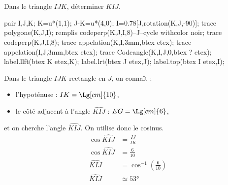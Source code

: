 \begin{methode}
    \exercice    
    Dans le triangle $IJK$, déterminer $\widehat{KIJ}$.\\
    \begin{Geometrie}[CoinHD={(6u,4.5u)}]        
        pair I,J,K;
        K=u*(1,1);
        J-K=u*(4,0);
        I=0.78[J,rotation(K,J,-90)];
        trace polygone(K,J,I);
        remplis codeperp(K,J,I,8)--J--cycle withcolor noir;
        trace codeperp(K,J,I,8);
        trace appelation(K,I,3mm,btex  etex);
        trace appelation(I,J,3mm,btex  etex);                
        trace Codeangle(K,I,J,0,btex ? etex);
        label.llft(btex K etex,K);
        label.lrt(btex J etex,J);
        label.top(btex I etex,I);
    \end{Geometrie}
    \correction
    Dans le triangle $IJK$ rectangle en $J$, on connaît :
    \begin{itemize}        
        \item l'hypoténuse : $IK=\Lg[cm]{10}$,
        \item le côté adjacent à l'angle $\widehat{KIJ}$ : $EG=\Lg[cm]{6}$,
    \end{itemize}
    et on cherche l'angle $\widehat{KIJ}$. On utilise donc le cosinus.
    \begin{align*}
        \cos\widehat{KIJ}&=\frac{IJ}{IK}\\
        \cos\widehat{KIJ}&=\frac{6}{10}\\
        \widehat{KIJ}&=\cos^{-1}\left(\frac{6}{10}\right)\\
        \widehat{KIJ}&\simeq\ang{53}
    \end{align*}
\end{methode}

